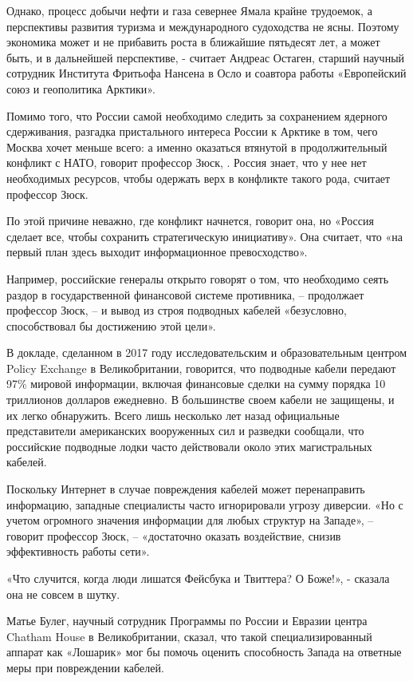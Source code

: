 Однако, процесс добычи нефти и газа севернее Ямала крайне трудоемок, а
перспективы развития туризма и международного судоходства не ясны.
Поэтому экономика может и не прибавить роста в ближайшие пятьдесят лет,
а может быть, и в дальнейшей перспективе, - считает Андреас Остаген,
старший научный сотрудник Института Фритьофа Нансена в Осло и соавтора
работы «Европейский союз и геополитика Арктики».

Помимо того, что России самой необходимо следить за сохранением ядерного
сдерживания, разгадка пристального интереса России к Арктике в том, чего
Москва хочет меньше всего: а именно оказаться втянутой в продолжительный
конфликт с НАТО, говорит профессор Зюск, . Россия знает, что у нее нет
необходимых ресурсов, чтобы одержать верх в конфликте такого рода,
считает профессор Зюск.

По этой причине неважно, где конфликт начнется, говорит она, но «Россия
сделает все, чтобы сохранить стратегическую инициативу». Она считает,
что «на первый план здесь выходит информационное превосходство».

Например, российские генералы открыто говорят о том, что необходимо
сеять раздор в государственной финансовой системе противника, --
продолжает профессор Зюск, -- и вывод из строя подводных кабелей
«безусловно, способствовал бы достижению этой цели».

В докладе, сделанном в 2017 году исследовательским и образовательным
центром Policy Exchange в Великобритании, говорится, что подводные
кабели передают 97\% мировой информации, включая финансовые сделки на
сумму порядка 10 триллионов долларов ежедневно. В большинстве своем
кабели не защищены, и их легко обнаружить. Всего лишь несколько лет
назад официальные представители американских вооруженных сил и разведки
сообщали, что российские подводные лодки часто действовали около этих
магистральных кабелей.

Поскольку Интернет в случае повреждения кабелей может перенаправить
информацию, западные специалисты часто игнорировали угрозу диверсии. «Но
с учетом огромного значения информации для любых структур на Западе», --
говорит профессор Зюск, -- «достаточно оказать воздействие, снизив
эффективность работы сети».

«Что случится, когда люди лишатся Фейсбука и Твиттера? О Боже!», -
сказала она не совсем в шутку.

Матье Булег, научный сотрудник Программы по России и Евразии центра
Chatham House в Великобритании, сказал, что такой специализированный
аппарат как «Лошарик» мог бы помочь оценить способность Запада на
ответные меры при повреждении кабелей.

